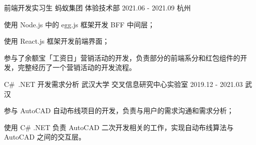 

\begin{cventries}

  \cventry
    {前端开发实习生} %
    {蚂蚁集团 \quad 体验技术部} %
    {2021.06 - 2021.09} %
    {杭州} %
    {
      \begin{cvitems} %
        \item {使用 Node.js 中的 egg.js 框架开发 BFF 中间层；}
        \item {使用 React.js 框架开发前端界面；}
        \item {参与了余额宝「工资日」营销活动的开发，负责部分的前端系分和红包组件的开发，完整经历了一个营销活动的开发流程。}
      \end{cvitems}
    }

  \cventry
    {C\#\ .NET 开发{\enskip\cdotp\enskip}需求分析} %
    {武汉大学 \quad 交叉信息研究中心实验室} %
    {2019.12 - 2021.03} %
    {武汉} %
    {
      \begin{cvitems} %
        \item {参与 AutoCAD 自动布线项目的开发，负责与用户的需求沟通和需求分析；}
        \item {使用 C\# .NET 负责 AutoCAD 二次开发相关的工作，实现自动布线算法与 AutoCAD 之间的交互层。}
      \end{cvitems}
    }

\end{cventries}
